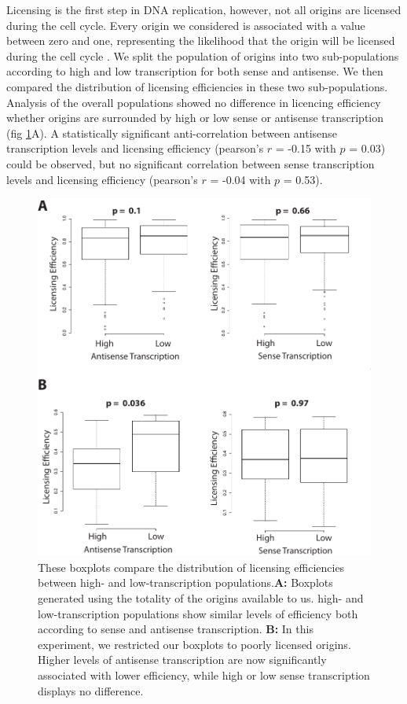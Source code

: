 Licensing is the first step in DNA replication, however, not all origins are licensed during the cell cycle.
Every origin we considered is associated with a value between zero and one, representing the likelihood that the origin will be licensed during the cell cycle \cite{hawkins:2013:highresolution}. 
We split the population of origins into two sub-populations according to high and low transcription for both sense and antisense. 
We then compared the distribution of licensing efficiencies in these two sub-populations. 
Analysis of the overall populations showed no difference in licencing efficiency whether origins are surrounded by high or low sense or antisense transcription (fig \ref{fig:licensing}A). 
A statistically significant anti-correlation between antisense transcription levels and licensing efficiency (pearson’s $r$ = -0.15 with $p$ = 0.03) could be observed, but no significant correlation between sense transcription levels and licensing efficiency (pearson’s $r$ = -0.04 with $p$ = 0.53). 
\begin{figure}[hp!]

\centering
\includegraphics[width=\textwidth]{figures/results/competence}
\caption[boxplots comparing licensing efficiencies in high- and low-transcription populations]{These boxplots compare the distribution of licensing efficiencies between high- and low-transcription populations.\textbf{A: }Boxplots generated using the totality of the origins available to us. high- and low-transcription populations show similar levels of efficiency both according to sense and antisense transcription. \textbf{B: } In this experiment, we restricted our boxplots to poorly licensed origins. Higher levels of antisense transcription are now significantly associated with lower efficiency, while high or low sense transcription displays no difference. }
\label{fig:licensing}

\end{figure} 
